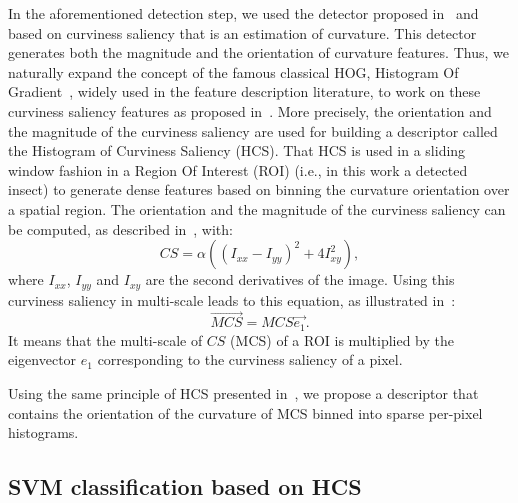 \documentclass[a4paper,conference]{IEEEtran}
\begin{document}
In the aforementioned detection step, we used the detector proposed in~\cite{7532314} and based on curviness saliency that is an estimation of curvature. This detector generates both the magnitude and the orientation of curvature features. Thus, we naturally expand the concept of the famous classical HOG, Histogram Of Gradient~\cite{dalal2005histograms}, widely used in the feature description literature, to work on these curviness saliency features as proposed in~\cite{rashwan2018using}. More precisely, the orientation and the magnitude of the curviness saliency are used for building a descriptor called the Histogram of Curviness Saliency (HCS). That HCS is used in a sliding window fashion in a Region Of Interest (ROI) (i.e., in this work a detected insect) to generate dense features based on binning the curvature orientation over a spatial region. The orientation and the magnitude of the curviness saliency can be computed, as described in~\cite{rashwan2018using}, with:
\begin{equation}
    CS = α ((I_{xx}-I_{yy})^2 + 4I_{xy}^2),
\label{equation:CS}
\end{equation}
where  $I_{xx}$, $I_{yy}$ and $I_{xy}$ are the second derivatives of the image. %
Using this curviness saliency in multi-scale leads to this equation, as illustrated in~\cite{7532314}:
\begin{equation}
    \overrightarrow{MCS} = MCS \overrightarrow{e_{1}}.
\label{equation:MCS}
\end{equation}
It means that the multi-scale of $CS$ (MCS) of a ROI is multiplied by the eigenvector $e_{1}$ corresponding to the curviness saliency of a pixel. 

Using the same principle of HCS presented in~\cite{rashwan2018using}, we propose a descriptor that contains the orientation of the curvature of MCS binned into sparse per-pixel histograms.

\subsection{SVM classification based on HCS}
\end{document}
